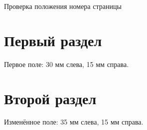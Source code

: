 \documentclass[14pt,a4paper,oneside]{extreport}
\begin{document}
\begin{GostTitlePage}
\begin{center}Проверка положения номера страницы\end{center}
\end{GostTitlePage}
\chapter{Первый раздел}
Первое поле: 30 мм слева, 15 мм справа.
\clearpage
{}
\chapter{Второй раздел}
Изменённое поле: 35 мм слева, 15 мм справа.
\end{document}
